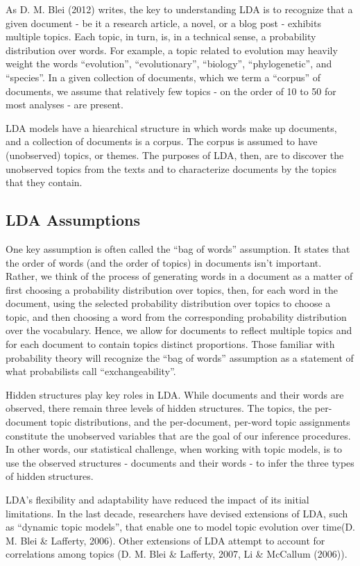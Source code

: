 \documentclass[12pt,]{article}
\begin{document}
As D. M. Blei (2012) writes, the key to understanding LDA is to
recognize that a given document - be it a research article, a novel, or
a blog post - exhibits multiple topics. Each topic, in turn, is, in a
technical sense, a probability distribution over words. For example, a
topic related to evolution may heavily weight the words ``evolution'',
``evolutionary'', ``biology'', ``phylogenetic'', and ``species''. In a
given collection of documents, which we term a ``corpus'' of documents,
we assume that relatively few topics - on the order of 10 to 50 for most
analyses - are present.

LDA models have a hiearchical structure in which words make up
documents, and a collection of documents is a corpus. The corpus is
assumed to have (unobserved) topics, or themes. The purposes of LDA,
then, are to discover the unobserved topics from the texts and to
characterize documents by the topics that they contain.

\subsection{LDA Assumptions}\label{lda-assumptions}

One key assumption is often called the ``bag of words'' assumption. It
states that the order of words (and the order of topics) in documents
isn't important. Rather, we think of the process of generating words in
a document as a matter of first choosing a probability distribution over
topics, then, for each word in the document, using the selected
probability distribution over topics to choose a topic, and then
choosing a word from the corresponding probability distribution over the
vocabulary. Hence, we allow for documents to reflect multiple topics and
for each document to contain topics distinct proportions. Those familiar
with probability theory will recognize the ``bag of words'' assumption
as a statement of what probabilists call ``exchangeability''.

Hidden structures play key roles in LDA. While documents and their words
are observed, there remain three levels of hidden structures. The
topics, the per-document topic distributions, and the per-document,
per-word topic assignments constitute the unobserved variables that are
the goal of our inference procedures. In other words, our statistical
challenge, when working with topic models, is to use the observed
structures - documents and their words - to infer the three types of
hidden structures.

LDA's flexibility and adaptability have reduced the impact of its
initial limitations. In the last decade, researchers have devised
extensions of LDA, such as ``dynamic topic models'', that enable one to
model topic evolution over time(D. M. Blei \& Lafferty, 2006). Other
extensions of LDA attempt to account for correlations among topics (D.
M. Blei \& Lafferty, 2007, Li \& McCallum (2006)).
\end{document}
